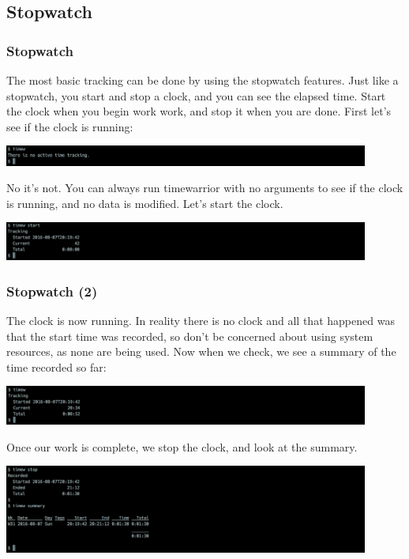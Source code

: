 \documentclass[t,handout]{beamer}
\begin{document}
\subsection{Stopwatch}

\begin{frame}[fragile]\frametitle{Stopwatch}
    The most basic tracking can be done by using the stopwatch features. Just like a stopwatch, you start and stop a clock, and you can see the elapsed time. Start the clock when you begin work work, and stop it when you are done. First let's see if the clock is running:

    \includegraphics[width=12cm]{images/tutorial3.png}

    No it's not. You can always run timewarrior with no arguments to see if the clock is running, and no data is modified. Let's start the clock.

    \includegraphics[width=12cm]{images/tutorial4.png}
\end{frame}

\begin{frame}[fragile]\frametitle{Stopwatch (2)}
    The clock is now running. In reality there is no clock and all that happened was that the start time was recorded, so don't be concerned about using system resources, as none are being used. Now when we check, we see a summary of the time recorded so far:

    \includegraphics[width=12cm]{images/tutorial5.png}

    Once our work is complete, we stop the clock, and look at the summary.

    \includegraphics[width=12cm]{images/tutorial6.png}
\end{frame}
\end{document}
